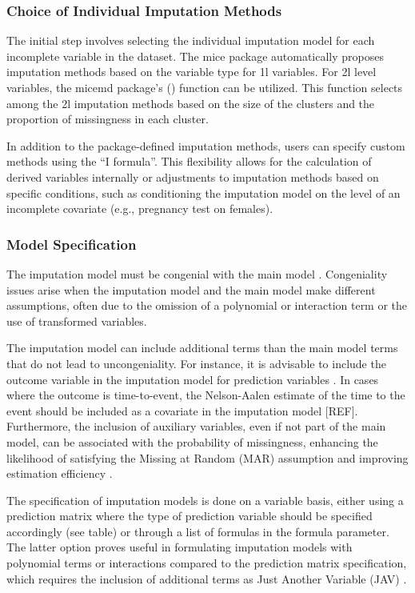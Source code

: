 \documentclass[
  article]{jss}
\begin{document}
\hypertarget{choice-of-individual-imputation-methods}{%
\subsubsection{Choice of Individual Imputation
Methods}\label{choice-of-individual-imputation-methods}}

The initial step involves selecting the individual imputation model for
each incomplete variable in the dataset. The mice package automatically
proposes imputation methods based on the variable type for 1l variables.
For 2l level variables, the micemd package's () function can be
utilized. This function selects among the 2l imputation methods based on
the size of the clusters and the proportion of missingness in each
cluster.

In addition to the package-defined imputation methods, users can specify
custom methods using the ``I formula''. This flexibility allows for the
calculation of derived variables internally or adjustments to imputation
methods based on specific conditions, such as conditioning the
imputation model on the level of an incomplete covariate (e.g.,
pregnancy test on females).

\hypertarget{model-specification}{%
\subsubsection{Model Specification}\label{model-specification}}

The imputation model must be congenial with the main model
\cite{meng1994}. Congeniality issues arise when the imputation model and
the main model make different assumptions, often due to the omission of
a polynomial or interaction term or the use of transformed variables.

The imputation model can include additional terms than the main model
terms that do not lead to uncongeniality. For instance, it is advisable
to include the outcome variable in the imputation model for prediction
variables \cite{moons2006a}. In cases where the outcome is
time-to-event, the Nelson-Aalen estimate of the time to the event should
be included as a covariate in the imputation model {[}REF{]}.
Furthermore, the inclusion of auxiliary variables, even if not part of
the main model, can be associated with the probability of missingness,
enhancing the likelihood of satisfying the Missing at Random (MAR)
assumption and improving estimation efficiency \cite{hardt2012a}.

The specification of imputation models is done on a variable basis,
either using a prediction matrix where the type of prediction variable
should be specified accordingly (see table) or through a list of
formulas in the formula parameter. The latter option proves useful in
formulating imputation models with polynomial terms or interactions
compared to the prediction matrix specification, which requires the
inclusion of additional terms as Just Another Variable (JAV)
\cite{buuren2018a}.
\end{document}
